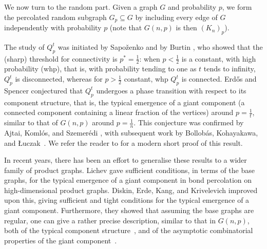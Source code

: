 \documentclass[notitlepage]{scrartcl}
\begin{document}
We now turn to the random part.
Given a graph $G$ and probability $p$, we form the percolated random subgraph $G_p\subseteq G$ by including every edge of $G$ independently with probability $p$ (note that $G(n,p)$ is then $(K_n)_p$). 

The study of $Q^t_p$ was initiated by Sapo\v{z}enko \cite{S67} and by Burtin \cite{B77}, who showed that the (sharp) threshold for connectivity is $p^*=\frac{1}{2}$: when $p<\frac{1}{2}$ is a constant, with high probability (whp), that is, with probability tending to one as $t$ tends to infinity, $Q^t_p$ is disconnected, whereas for $p>\frac{1}{2}$ constant, whp $Q^t_p$ is connected. Erd\H{o}s and Spencer \cite{ES79} conjectured that $Q^t_p$ undergoes a phase transition with respect to its component structure, that is, the typical emergence of a giant component (a connected component containing a linear fraction of the vertices) around $p=\frac{1}{t}$, similar to that of $G(n,p)$ around $p=\frac{1}{n}$. This conjecture was confirmed by Ajtai, Koml\'os, and Szemer\'edi \cite{AKS81}, with subsequent work by Bollob\'as, Kohayakawa, and \L{}uczak~\cite{BKL92}. We refer the reader to \cite{K23} for a modern short proof of this result.

In recent years, there has been an effort to generalise these results to a wider family of product graphs. Lichev \cite{L22} gave sufficient conditions, in terms of the base graphs, for the typical emergence of a giant component in bond percolation on high-dimensional product graphs. Diskin, Erde, Kang, and Krivelevich \cite{DEKK23} improved upon this, giving sufficient and tight conditions for the typical emergence of a giant component. Furthermore, they showed that assuming the base graphs are regular, one can give a rather precise description, similar to that in $G(n,p)$, both of the typical component structure~\cite{DEKK22}, and of the asymptotic combinatorial properties of the giant component~\cite{DEKK24}. 
\end{document}
